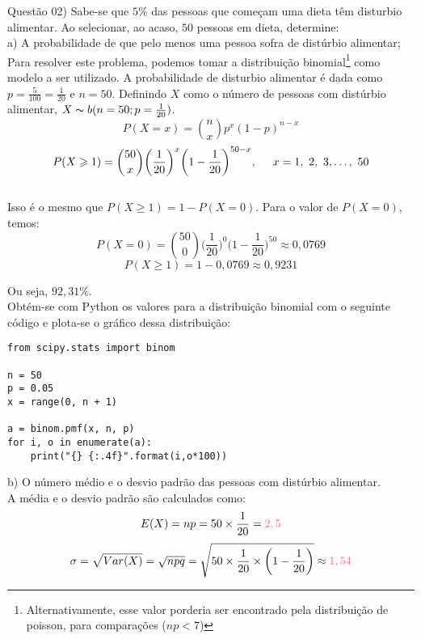 
\noindent \textcolor{COLOR1}{Questão 02)} Sabe-se que $5\%$ das pessoas que começam uma dieta têm disturbio alimentar. Ao selecionar, ao acaso,
$50$ pessoas em dieta, determine:
\\

a) A probabilidade de que pelo menos uma pessoa sofra de distúrbio alimentar;
\\

Para resolver este problema, podemos tomar a distribuição binomial\footnote{Alternativamente, esse valor porderia ser encontrado pela distribuição de poisson, para comparações ($np<7$)} como modelo a ser utilizado. A probabilidade de disturbio alimentar é dada como $p=\frac{5}{100}=\frac{1}{20}$ e $n=50$. Definindo $X$ como o número de pessoas com distúrbio alimentar, $X \thicksim  b(n=50;p=\frac{1}{20})$.
\\

\[
    P(X=x)=\binom{n}{x}p^x(1-p)^{n-x}
\]
\[
    P(X\geqslant 1)=\binom{50}{x}\biggl(\frac{1}{20}\biggr)^x\biggl(1-\frac{1}{20}\biggr)^{50-x}, \hspace{0.5cm} x=1,\ 2,\ 3,\dots,\ 50
\]
\\

Isso é o mesmo que $P(X\geqslant 1)=1-P(X=0)$. Para o valor de $P(X=0)$, temos:\\

\[
    P(X=0)=\binom{50}{0}\biggl(\frac{1}{20}\biggr)^0\biggl(1-\frac{1}{20}\biggr)^{50}\approx 0,0769
\]
\[
    P(X\geqslant 1)=1-0,0769 \approx 0,9231
\]

Ou seja, \textcolor{COLOR2}{$92,31\%$}.
\\

Obtém-se com Python os valores para a distribuição binomial com o seguinte código e plota-se o gráfico dessa distribuição:\\

\begin{lstlisting}
from scipy.stats import binom

n = 50
p = 0.05
x = range(0, n + 1)
    
a = binom.pmf(x, n, p)
for i, o in enumerate(a):
    print("{} {:.4f}".format(i,o*100))
\end{lstlisting}




b) O número médio e o desvio padrão das pessoas com distúrbio alimentar.\\

A média e o desvio padrão são calculados como:\\

\[
    E(X) = np = 50\times\frac{1}{20} = \textcolor{COLOR2}{2,5}
\]
\[
    \sigma = \sqrt{Var(X)} = \sqrt{npq} = \sqrt{50 \times \frac{1}{20} \times \biggl(1-\frac{1}{20}\biggr)} \approx \textcolor{COLOR2}{1,54}
\]
